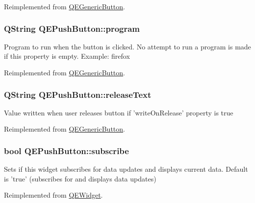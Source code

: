 Reimplemented from \hyperlink{classQEGenericButton}{QEGenericButton}.

\hypertarget{classQEPushButton_ab038376ec0c330b1aba8c23d82e2f263}{
\subsubsection[{program}]{\setlength{\rightskip}{0pt plus 5cm}QString QEPushButton::program}}
\label{classQEPushButton_ab038376ec0c330b1aba8c23d82e2f263}
Program to run when the button is clicked. No attempt to run a program is made if this property is empty. Example: firefox 

Reimplemented from \hyperlink{classQEGenericButton}{QEGenericButton}.

\hypertarget{classQEPushButton_a1f08055d333a9899ccaffc3574d38d02}{
\subsubsection[{releaseText}]{\setlength{\rightskip}{0pt plus 5cm}QString QEPushButton::releaseText}}
\label{classQEPushButton_a1f08055d333a9899ccaffc3574d38d02}
Value written when user releases button if 'writeOnRelease' property is true 

Reimplemented from \hyperlink{classQEGenericButton}{QEGenericButton}.

\hypertarget{classQEPushButton_ae3b3fce6a82cb4982174855b7c5af2f3}{
\subsubsection[{subscribe}]{\setlength{\rightskip}{0pt plus 5cm}bool QEPushButton::subscribe}}
\label{classQEPushButton_ae3b3fce6a82cb4982174855b7c5af2f3}
Sets if this widget subscribes for data updates and displays current data. Default is 'true' (subscribes for and displays data updates) 

Reimplemented from \hyperlink{classQEWidget}{QEWidget}.

